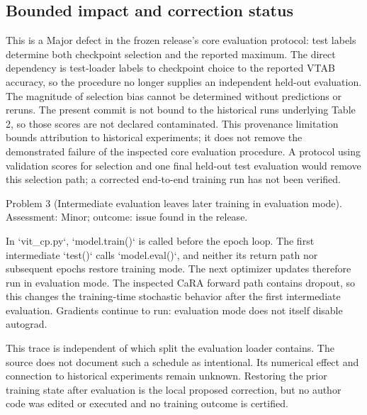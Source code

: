 \documentclass[10pt]{article}
\begin{document}
\subsection*{Bounded impact and correction status}
This is a Major defect in the frozen release’s core evaluation protocol: test labels determine both checkpoint selection and the reported maximum. The direct dependency is test-loader labels to checkpoint choice to the reported VTAB accuracy, so the procedure no longer supplies an independent held-out evaluation. The magnitude of selection bias cannot be determined without predictions or reruns. The present commit is not bound to the historical runs underlying Table 2, so those scores are not declared contaminated. This provenance limitation bounds attribution to historical experiments; it does not remove the demonstrated failure of the inspected core evaluation procedure. A protocol using validation scores for selection and one final held-out test evaluation would remove this selection path; a corrected end-to-end training run has not been verified.\par
Problem 3 (Intermediate evaluation leaves later training in evaluation mode).  Assessment: Minor; outcome: issue found in the release.\par
In `vit\_cp.py`, `model.train()` is called before the epoch loop. The first intermediate `test()` calls `model.eval()`, and neither its return path nor subsequent epochs restore training mode. The next optimizer updates therefore run in evaluation mode. The inspected CaRA forward path contains dropout, so this changes the training-time stochastic behavior after the first intermediate evaluation. Gradients continue to run: evaluation mode does not itself disable autograd.\par
This trace is independent of which split the evaluation loader contains. The source does not document such a schedule as intentional. Its numerical effect and connection to historical experiments remain unknown. Restoring the prior training state after evaluation is the local proposed correction, but no author code was edited or executed and no training outcome is certified.\par
\end{document}
